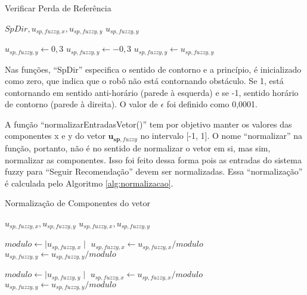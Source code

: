 	\begin{algorithm}
		\caption{Verificar Perda de Referência}
		\label{alg:verificarPerdaReferencia}%
		\begin{algorithmic}[1]
	
		\REQUIRE $SpDir, u_{sp,\mathit{fuzzy}, x}, u_{sp,\mathit{fuzzy}, y}$
		\ENSURE $u_{sp,\mathit{fuzzy}, y}$
		
				\STATE $u_{sp,\mathit{fuzzy}, y} \leftarrow 0,3$
				\STATE $u_{sp,\mathit{fuzzy}, y} \leftarrow -0,3$
			\ELSE
				\STATE $u_{sp,\mathit{fuzzy}, y} \leftarrow u_{sp,\mathit{fuzzy}, y}$
			\ENDIF
		\ENDIF
	
		\end{algorithmic}
	\end{algorithm}
	
	Nas funções, ``SpDir'' especifica o sentido de contorno e a princípio, é inicializado
	como zero, que indica que o robô não está contornando obstáculo. Se 1, está contornando em 
	sentido anti-horário (parede à esquerda) e se -1, sentido horário de contorno (parede à 
	direita). O valor de $\epsilon$ foi definido como 0,0001. 
	
 	A função ``normalizarEntradasVetor()'' tem por objetivo manter os valores das componentes
 	x e y do vetor $\mathbf{u_{sp,\mathit{fuzzy}}}$ no intervalo [-1, 1]. O nome ``normalizar''
 	na função, portanto, não é no sentido de normalizar o vetor em si, mas sim, normalizar
 	as componentes. Isso foi feito dessa forma pois as entradas do sistema fuzzy para ``Seguir
 	Recomendação'' devem ser normalizadas. Essa ``normalização'' é calculada pelo Algoritmo
 	\ref{alg:normalizacao}.
	\begin{algorithm}
		\caption{Normalização de Componentes do vetor}
		\label{alg:normalizacao}%
		\begin{algorithmic}[1]
	
		\REQUIRE $u_{sp,\mathit{fuzzy}, x}, u_{sp,\mathit{fuzzy}, y}$
		\ENSURE $u_{sp,\mathit{fuzzy}, x}, u_{sp,\mathit{fuzzy}, y}$
		
		\STATE $modulo \leftarrow \mid u_{sp,\mathit{fuzzy}, x} \mid$
		\IF{$modulo > 1$}
			\STATE $u_{sp,\mathit{fuzzy}, x} \leftarrow u_{sp,\mathit{fuzzy}, x}/modulo$
			\STATE $u_{sp,\mathit{fuzzy}, y} \leftarrow u_{sp,\mathit{fuzzy}, y}/modulo$
		\ENDIF
		
		\STATE $modulo \leftarrow \mid u_{sp,\mathit{fuzzy}, y} \mid$
		\IF{$modulo > 1$}
			\STATE $u_{sp,\mathit{fuzzy}, x} \leftarrow u_{sp,\mathit{fuzzy}, x}/modulo$
			\STATE $u_{sp,\mathit{fuzzy}, y} \leftarrow u_{sp,\mathit{fuzzy}, y}/modulo$
		\ENDIF
	
		\end{algorithmic}
	\end{algorithm}
	
